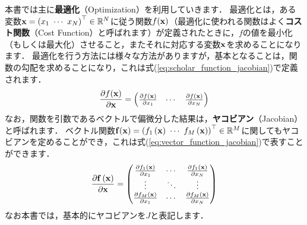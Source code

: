 本書では主に{\bf 最適化}（Optimization）を利用していきます．
最適化とは，ある変数${\bf x} = \left( x_{1} ~ \cdots ~ x_{N} \right)^{\top} \in \mathbb{R}^{N}$に従う関数$f({\bf x})$（最適化に使われる関数はよく{\bf コスト関数}（Cost Function）と呼ばれます）が定義されたときに，$f$の値を最小化（もしくは最大化）させること，またそれに対応する変数${\bf x}$を求めることになります．
最適化を行う方法には様々な方法がありますが，基本となることは，関数の勾配を求めることになり，これは式(\ref{eq:scholar_function_jacobian})で定義されます．
%
\begin{align}
  \frac{ \partial f({\bf x}) }{ \partial {\bf x} } =
  \left( \begin{matrix}
    \frac{ \partial f({\bf x}) }{ \partial x_{1} } &
    \cdots                                         &
    \frac{ \partial f({\bf x}) }{ \partial x_{N} }
  \end{matrix} \right)
  \label{eq:scholar_function_jacobian}
\end{align}
%
なお，関数を引数であるベクトルで偏微分した結果は，{\bf ヤコビアン}（Jacobian）と呼ばれます．
ベクトル関数${\bf f}({\bf x}) = \left( f_{1} \left( {\bf x} \right) ~ \cdots ~ f_{M} \left( {\bf x} \right) \right)^{\top} \in \mathbb{R}^{M}$に関してもヤコビアンを定めることができ，これは式(\ref{eq:vector_function_jacobian})で表すことができます．
%
\begin{align}
  \frac{ \partial {\bf f} \left( {\bf x} \right) }{ \partial {\bf x} } =
  \left( \begin{matrix}
    \frac{ \partial f_{1} \left( {\bf x} \right) }{ \partial x_{1} } &
    \cdots                                             &
    \frac{ \partial f_{1} \left( {\bf x} \right) }{ \partial x_{N} } \\
    \vdots                                             &
    \ddots                                             &
    \vdots                                             \\
    \frac{ \partial f_{M} \left( {\bf x} \right) }{ \partial x_{1} } &
    \cdots                                             &
    \frac{ \partial f_{M} \left( {\bf x} \right) }{ \partial x_{N} } \\
  \end{matrix} \right)
  \label{eq:vector_function_jacobian}
\end{align}
%
なお本書では，基本的にヤコビアンを$J$と表記します．

